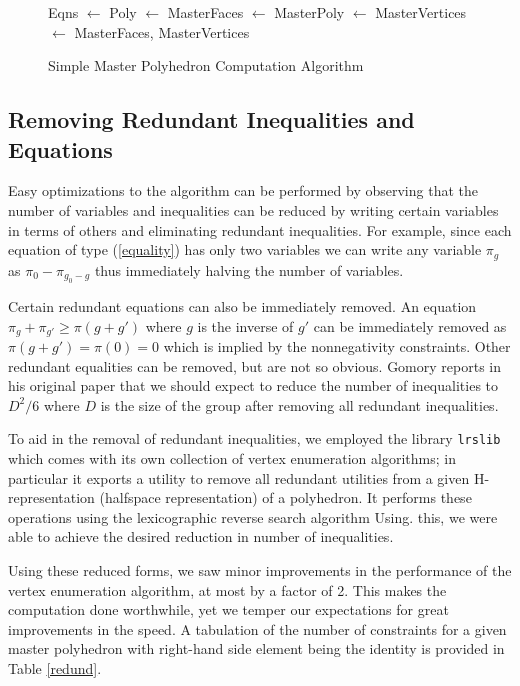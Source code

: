\documentclass{article}
\begin{document}
	\begin{figure}
		\begin{algorithmic}
			\State Eqns $\gets$ 
			\State Poly $\gets$ 
			\State MasterFaces $\gets$ 
			\State MasterPoly $\gets$ 
			\State MasterVertices $\gets$ 
			\State \Return MasterFaces, MasterVertices
			\EndFunction
		\end{algorithmic}
		\caption{Simple Master Polyhedron Computation Algorithm}
		\label{alg1}
	\end{figure}

	\subsection{Removing Redundant Inequalities and Equations}
	Easy optimizations to the algorithm can be performed by observing that the number of variables and inequalities can be reduced by writing certain variables in terms of others and eliminating redundant inequalities. For example, since each equation of type (\ref{equality}) has only two variables we can write any variable $\pi_g$ as $\pi_0 - \pi_{g_0 - g}$ thus immediately halving the number of variables. 
	
	Certain redundant equations can also be immediately removed. An equation $\pi_g + \pi_{g'} \ge \pi(g + g')$ where $g$ is the inverse of $g'$ can be immediately removed as $\pi(g + g') = \pi(0) = 0$ which is implied by the nonnegativity constraints. Other redundant equalities can be removed, but are not so obvious. Gomory reports in his original paper that we should expect to reduce the number of inequalities to $D^2/6$ where $D$ is the size of the group after removing all redundant inequalities.
	
	To aid in the removal of redundant inequalities, we employed the library \texttt{lrslib} which comes with its own collection of vertex enumeration algorithms; in particular it exports a utility to remove all redundant utilities from a given H-representation (halfspace representation) of a polyhedron. It performs these operations using the lexicographic reverse search algorithm Using. this, we were able to achieve the desired reduction in number of inequalities.
	
	Using these reduced forms, we saw minor improvements in the performance of the vertex enumeration algorithm, at most by a factor of 2. This makes the computation done worthwhile, yet we temper our expectations for great improvements in the speed. A tabulation of the number of constraints for a given master polyhedron with right-hand side element being the identity is provided in Table \ref{redund}.
	
\end{document}
